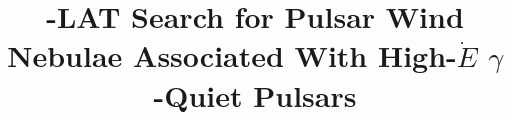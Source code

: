 \documentclass[12pt,preprint]{aastex}
\begin{document}
\title{\fermi-LAT Search for Pulsar Wind Nebulae Associated With High-$\dot E$ $\gamma$-Quiet Pulsars}









\appendix

\end{document}
